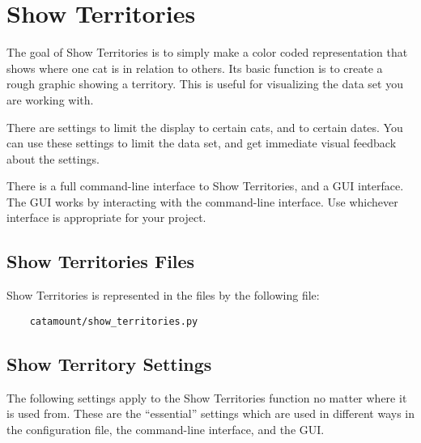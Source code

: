 \chapter{Show Territories}
\hypertarget{show-territories}{}

The goal of Show Territories is to simply make a color coded
representation that shows where one cat is in relation to others. Its
basic function is to create a rough graphic showing a territory. This
is useful for visualizing the data set you are working with.

There are settings to limit the display to certain cats, and to
certain dates. You can use these settings to limit the data set, and
get immediate visual feedback about the settings.

There is a full command-line interface to Show Territories, and a GUI
interface. The GUI works by interacting with the command-line
interface. Use whichever interface is appropriate for your project.

\section{Show Territories Files}

Show Territories is represented in the files by the following file:

\begin{verbatim}
    catamount/show_territories.py
\end{verbatim}

\section{Show Territory Settings}
\hypertarget{territory-settings}{}

The following settings apply to the Show Territories function no
matter where it is used from. These are the ``essential'' settings
which are used in different ways in the configuration file, the
command-line interface, and the GUI.

